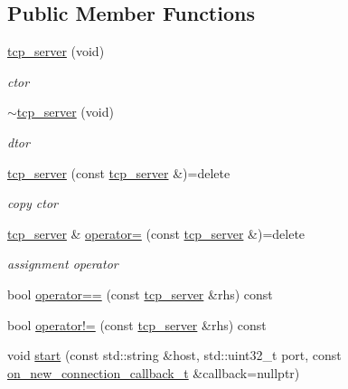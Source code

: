 \subsection*{Public Member Functions}
\begin{DoxyCompactItemize}
\item 
\hyperlink{classtacopie_1_1tcp__server_a4f67a38a0764924768cbcc7cf68527bf}{tcp\+\_\+server} (void)
\begin{DoxyCompactList}\small\item\em ctor \end{DoxyCompactList}\item 
\hyperlink{classtacopie_1_1tcp__server_a7841dc528e2d3dfc94fbe9b93824da50}{$\sim$tcp\+\_\+server} (void)
\begin{DoxyCompactList}\small\item\em dtor \end{DoxyCompactList}\item 
\hyperlink{classtacopie_1_1tcp__server_a2d9c6a2dea95a3c6a919c655d6e8e0ba}{tcp\+\_\+server} (const \hyperlink{classtacopie_1_1tcp__server}{tcp\+\_\+server} \&)=delete
\begin{DoxyCompactList}\small\item\em copy ctor \end{DoxyCompactList}\item 
\hyperlink{classtacopie_1_1tcp__server}{tcp\+\_\+server} \& \hyperlink{classtacopie_1_1tcp__server_a7e7da4352e2e016f8d40d19bf9fee54b}{operator=} (const \hyperlink{classtacopie_1_1tcp__server}{tcp\+\_\+server} \&)=delete
\begin{DoxyCompactList}\small\item\em assignment operator \end{DoxyCompactList}\item 
bool \hyperlink{classtacopie_1_1tcp__server_ab9b95a27afb405668bb4d5b1a312ceae}{operator==} (const \hyperlink{classtacopie_1_1tcp__server}{tcp\+\_\+server} \&rhs) const
\item 
bool \hyperlink{classtacopie_1_1tcp__server_aa45611b77d60b536aeaf626d1724342d}{operator!=} (const \hyperlink{classtacopie_1_1tcp__server}{tcp\+\_\+server} \&rhs) const
\item 
void \hyperlink{classtacopie_1_1tcp__server_a6cb98b50d865b32dba497273a0eca1e9}{start} (const std\+::string \&host, std\+::uint32\+\_\+t port, const \hyperlink{classtacopie_1_1tcp__server_a103cb4e6fcab00f88a708aabd38b66ff}{on\+\_\+new\+\_\+connection\+\_\+callback\+\_\+t} \&callback=nullptr)
\item 

\end{DoxyCompactItemize}
